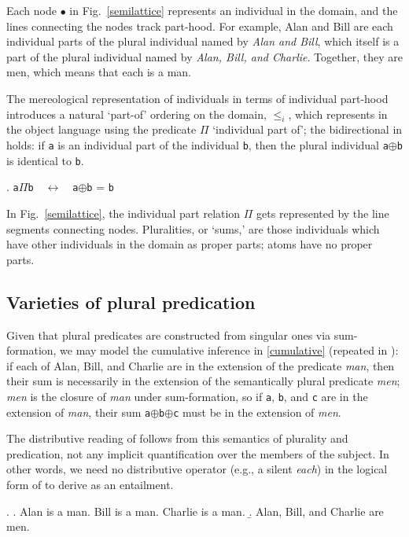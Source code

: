 \documentclass[linguex]{sp}
\renewcommand{\tt}{\texttt}
\newcommand{\op}{$\oplus$}
\begin{document}
\noindent Each node $\bullet$ in Fig.\ \ref{semilattice} represents an individual in the domain, and the lines connecting the nodes track part-hood. For example, Alan and Bill are each individual parts of the plural individual named by \emph{Alan and Bill}, which itself is a part of the plural individual named by \emph{Alan, Bill, and Charlie}. Together, they are men, which means that each is a man.

The mereological representation of individuals in terms of individual part-hood introduces a natural `part-of' ordering on the domain, $\leq_{i}$, which \citeauthor{link1983} represents in the object language using the predicate $\Pi$ `individual part of'; the bidirectional in \Next holds: if \tt{a} is an individual part of the individual \tt{b}, then the plural individual \tt{a}\op\tt{b} is identical to \tt{b}.

\ex. \tt{a}$\Pi$\tt{b}\ \ $\leftrightarrow$\ \ \tt{a}\op\tt{b} = \tt{b}

In Fig.\ \ref{semilattice}, the individual part relation $\Pi$ gets represented by the line segments connecting nodes. Pluralities, or `sums,' are those individuals which have other individuals in the domain as proper parts; atoms have no proper parts.

\subsection{Varieties of plural predication}

Given that plural predicates are constructed from singular ones via sum-formation, we may model the cumulative inference in \ref{cumulative} (repeated in \Next): if each of Alan, Bill, and Charlie are in the extension of the predicate \emph{man}, then their sum is necessarily in the extension of the semantically plural predicate \emph{men}; \emph{men} is the closure of \emph{man} under sum-formation, so if \tt{a}, \tt{b}, and \tt{c} are in the extension of \emph{man}, their sum \tt{a}\op\tt{b}\op\tt{c} must be in the extension of \emph{men}.

The distributive reading of \Next[b] follows from this semantics of plurality and predication, not any implicit quantification over the members of the subject. In other words, we need no  distributive operator (e.g., a silent \emph{each}) in the logical form of \Next[b] to derive \Next[a] as an entailment.

\ex. \a. Alan is a man. Bill is a man. Charlie is a man.
\b. Alan, Bill, and Charlie are men.
\end{document}
